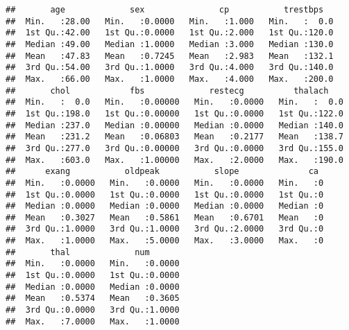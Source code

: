 \documentclass[]{article}
\newenvironment{Shaded}{\begin{snugshade}}{\end{snugshade}}
\newcommand{\KeywordTok}[1]{\textcolor[rgb]{0.13,0.29,0.53}{\textbf{#1}}}
\newcommand{\StringTok}[1]{\textcolor[rgb]{0.31,0.60,0.02}{#1}}
\newcommand{\CommentTok}[1]{\textcolor[rgb]{0.56,0.35,0.01}{\textit{#1}}}
\newcommand{\OperatorTok}[1]{\textcolor[rgb]{0.81,0.36,0.00}{\textbf{#1}}}
\newcommand{\NormalTok}[1]{#1}
\begin{document}
\begin{verbatim}
##       age             sex               cp           trestbps    
##  Min.   :28.00   Min.   :0.0000   Min.   :1.000   Min.   :  0.0  
##  1st Qu.:42.00   1st Qu.:0.0000   1st Qu.:2.000   1st Qu.:120.0  
##  Median :49.00   Median :1.0000   Median :3.000   Median :130.0  
##  Mean   :47.83   Mean   :0.7245   Mean   :2.983   Mean   :132.1  
##  3rd Qu.:54.00   3rd Qu.:1.0000   3rd Qu.:4.000   3rd Qu.:140.0  
##  Max.   :66.00   Max.   :1.0000   Max.   :4.000   Max.   :200.0  
##       chol            fbs             restecg          thalach     
##  Min.   :  0.0   Min.   :0.00000   Min.   :0.0000   Min.   :  0.0  
##  1st Qu.:198.0   1st Qu.:0.00000   1st Qu.:0.0000   1st Qu.:122.0  
##  Median :237.0   Median :0.00000   Median :0.0000   Median :140.0  
##  Mean   :231.2   Mean   :0.06803   Mean   :0.2177   Mean   :138.7  
##  3rd Qu.:277.0   3rd Qu.:0.00000   3rd Qu.:0.0000   3rd Qu.:155.0  
##  Max.   :603.0   Max.   :1.00000   Max.   :2.0000   Max.   :190.0  
##      exang           oldpeak           slope              ca   
##  Min.   :0.0000   Min.   :0.0000   Min.   :0.0000   Min.   :0  
##  1st Qu.:0.0000   1st Qu.:0.0000   1st Qu.:0.0000   1st Qu.:0  
##  Median :0.0000   Median :0.0000   Median :0.0000   Median :0  
##  Mean   :0.3027   Mean   :0.5861   Mean   :0.6701   Mean   :0  
##  3rd Qu.:1.0000   3rd Qu.:1.0000   3rd Qu.:2.0000   3rd Qu.:0  
##  Max.   :1.0000   Max.   :5.0000   Max.   :3.0000   Max.   :0  
##       thal             num        
##  Min.   :0.0000   Min.   :0.0000  
##  1st Qu.:0.0000   1st Qu.:0.0000  
##  Median :0.0000   Median :0.0000  
##  Mean   :0.5374   Mean   :0.3605  
##  3rd Qu.:0.0000   3rd Qu.:1.0000  
##  Max.   :7.0000   Max.   :1.0000
\end{verbatim}

\begin{Shaded}
\end{Shaded}
\end{document}
